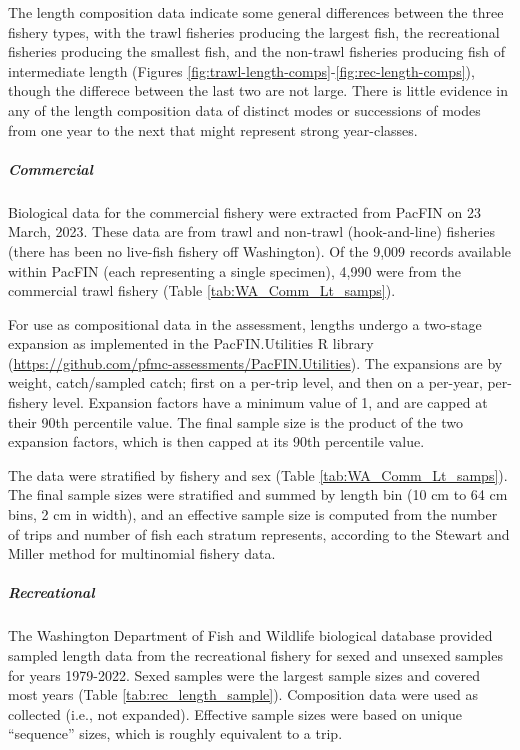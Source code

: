 \documentclass[11pt,
  english,
  letterpaper,
]{article}
\begin{document}
The length composition data indicate some general differences between the three fishery types, with the trawl fisheries producing the largest fish, the recreational fisheries producing the smallest fish, and the non-trawl fisheries producing fish of intermediate length (Figures \ref{fig:trawl-length-comps}-\ref{fig:rec-length-comps}), though the differece between the last two are not large. There is little evidence in any of the length composition data of distinct modes or successions of modes from one year to the next that might represent strong year-classes.

\hypertarget{commercial}{%
\subparagraph{Commercial}\label{commercial}}

Biological data for the commercial fishery were extracted from PacFIN on 23 March, 2023. These data are from trawl and non-trawl (hook-and-line) fisheries (there has been no live-fish fishery off Washington). Of the 9,009 records available within PacFIN (each representing a single specimen), 4,990 were from the commercial trawl fishery (Table \ref{tab:WA_Comm_Lt_samps}).

For use as compositional data in the assessment, lengths undergo a two-stage expansion as implemented in the PacFIN.Utilities R library (\url{https://github.com/pfmc-assessments/PacFIN.Utilities}). The expansions are by weight, catch/sampled catch; first on a per-trip level, and then on a per-year, per-fishery level. Expansion factors have a minimum value of 1, and are capped at their 90th percentile value. The final sample size is the product of the two expansion factors, which is then capped at its 90th percentile value.

The data were stratified by fishery and sex (Table \ref{tab:WA_Comm_Lt_samps}). The final sample sizes were stratified and summed by length bin (10 cm to 64 cm bins, 2 cm in width), and an effective sample size is computed from the number of trips and number of fish each stratum represents, according to the Stewart and Miller method for multinomial fishery data.

\hypertarget{recreational}{%
\subparagraph{Recreational}\label{recreational}}

The Washington Department of Fish and Wildlife biological database provided sampled length data from the recreational fishery for sexed and unsexed samples for years 1979-2022. Sexed samples were the largest sample sizes and covered most years (Table \ref{tab:rec_length_sample}). Composition data were used as collected (i.e., not expanded). Effective sample sizes were based on unique ``sequence'' sizes, which is roughly equivalent to a trip.
\end{document}
